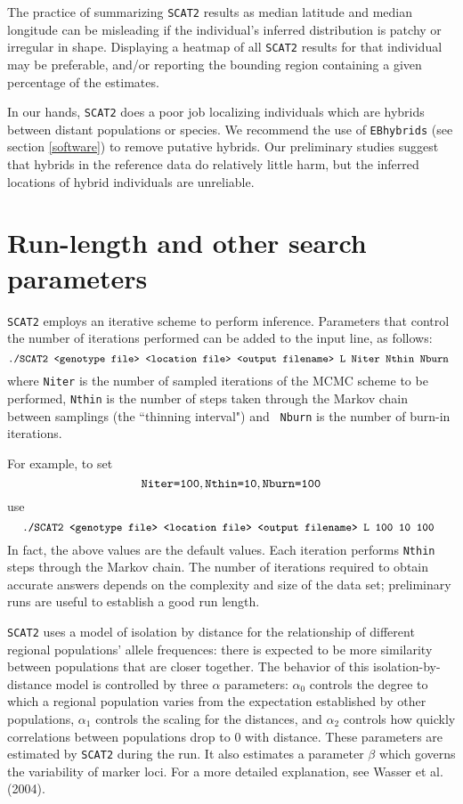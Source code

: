 \documentclass[10pt,titlepage,times,letterpaper]{article}
\def\SCAT{{\tt SCAT2} }
\begin{document}
The practice of summarizing \SCAT results as median latitude and
median longitude can be misleading if the individual's
inferred distribution is patchy or irregular in shape.  Displaying
a heatmap of all \SCAT results for that individual may be preferable,
and/or reporting the bounding region containing a given percentage
of the estimates.

In our hands, \SCAT does a poor job localizing individuals which are
hybrids between distant populations or species.  We recommend the use
of {\tt EBhybrids} (see section \ref{software}) to remove putative hybrids.
Our preliminary studies suggest that hybrids in the reference data do
relatively little harm, but the inferred locations of hybrid individuals are
unreliable.


\section{Run-length and other search parameters} \label{HowLong}

\SCAT employs an iterative scheme to perform inference. 
Parameters that control the number of iterations performed
can be added to the input line, as follows:
$$\text{{\small \tt ./SCAT2 <genotype file> <location file> <output
filename> L Niter Nthin Nburn }}$$ where {\tt Niter} is the number
of sampled iterations of the MCMC scheme to be performed, {\tt Nthin} is the
number of steps taken through the Markov chain between samplings (the ``thinning interval") and {\tt
Nburn} is the number of burn-in iterations.

For example, to set
$$\text{{\tt Niter=100}}, \text{{\tt Nthin=10}}, \text{{\tt Nburn=100}}$$
use
$$\text{{\tt \small./SCAT2 <genotype file> <location file> <output
filename> L 100 10 100 }}$$ 
In fact, the above values are the
default values. Each iteration performs {\tt Nthin}
steps through the Markov chain.
The number of iterations required to obtain accurate answers depends
on the complexity and size of the data set; preliminary runs are useful
to establish a good run length.

\SCAT uses a model of isolation by distance for the relationship of
different regional populations' allele frequences:  there is expected to
be more similarity between populations that are closer together.  The
behavior of this isolation-by-distance model is controlled by three
$\alpha$ parameters:  $\alpha_0$ controls the degree to which a regional
population varies from the expectation established by other populations,
$\alpha_1$ controls the scaling for the distances, and $\alpha_2$
controls how quickly correlations between populations drop to 0 with distance.
These parameters are estimated by \SCAT during the run.
It also estimates a parameter $\beta$ which governs the variability
of marker loci.  For a more detailed explanation, see Wasser et al. (2004).
\end{document}
